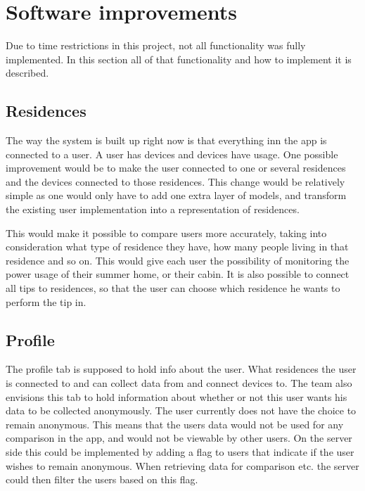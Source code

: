 \section{Software improvements}
Due to time restrictions in this project, not all functionality was fully implemented. In this section all of that functionality and how to implement it is described. 

\subsection{Residences}
The way the system is built up right now is that everything inn the app is connected to a user. A user has devices and devices have usage. One possible improvement would be to make the user connected to one or several residences and the devices connected to those residences. This change would be relatively simple as one would only have to add one extra layer of models, and transform the existing user implementation into a representation of residences.

This would make it possible to compare users more accurately, taking into consideration what type of residence they have, how many people living in that residence and so on. This would give each user the possibility of monitoring the power usage of their summer home, or their cabin. It is also possible to connect all tips to residences, so that the user can choose which residence he wants to perform the tip in. 

\subsection{Profile}

The profile tab is supposed to hold info about the user. What residences the user is connected to and can collect data from and connect devices to. The team also envisions this tab to hold information about whether or not this user wants his data to be collected anonymously. The user currently does not have the choice to remain anonymous. This means that the users data would not be used for any comparison in the app, and would not be viewable by other users. On the server side this could be implemented by adding a flag to users that indicate if the user wishes to remain anonymous. When retrieving data for comparison etc. the server could then filter the users based on this flag.